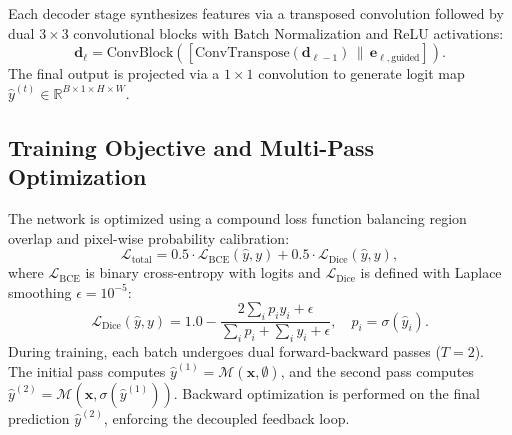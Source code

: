 Each decoder stage synthesizes features via a transposed convolution followed by dual $3 \times 3$ convolutional blocks with Batch Normalization and ReLU activations:
\begin{equation}
  \mathbf{d}_\ell = \text{ConvBlock}\left(\left[\text{ConvTranspose}(\mathbf{d}_{\ell-1}) \,\|\, \mathbf{e}_{\ell, \text{guided}}\right]\right).
\end{equation}
The final output is projected via a $1 \times 1$ convolution to generate logit map $\hat{y}^{(t)} \in \mathbb{R}^{B \times 1 \times H \times W}$.

\subsection{Training Objective and Multi-Pass Optimization}
The network is optimized using a compound loss function balancing region overlap and pixel-wise probability calibration:
\begin{equation}
  \mathcal{L}_{\text{total}} = 0.5 \cdot \mathcal{L}_{\text{BCE}}\left(\hat{y}, y\right) + 0.5 \cdot \mathcal{L}_{\text{Dice}}\left(\hat{y}, y\right),
\end{equation}
where $\mathcal{L}_{\text{BCE}}$ is binary cross-entropy with logits and $\mathcal{L}_{\text{Dice}}$ is defined with Laplace smoothing $\epsilon = 10^{-5}$:
\begin{equation}
  \mathcal{L}_{\text{Dice}}\left(\hat{y}, y\right) = 1.0 - \frac{2 \sum_i p_i y_i + \epsilon}{\sum_i p_i + \sum_i y_i + \epsilon}, \quad p_i = \sigma(\hat{y}_i).
\end{equation}
During training, each batch undergoes dual forward-backward passes ($T=2$). The initial pass computes $\hat{y}^{(1)} = \mathcal{M}(\mathbf{x}, \emptyset)$, and the second pass computes $\hat{y}^{(2)} = \mathcal{M}(\mathbf{x}, \sigma(\hat{y}^{(1)}))$. Backward optimization is performed on the final prediction $\hat{y}^{(2)}$, enforcing the decoupled feedback loop.
